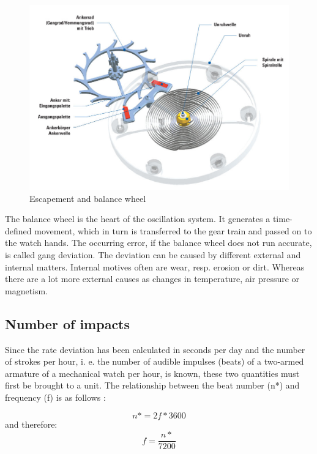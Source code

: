 \documentclass[12pt, a4paper]{report}
\begin{document}
    \noindent
    \begin{figure}[H]
    \centering
    \includegraphics[scale=0.4]{Images/Hemmung-Teil1.jpg}
    
    \caption{Escapement and balance wheel \cite{Uhrwerk}}
    \end{figure}
\bigskip
The balance wheel is the heart of the oscillation system. It generates a time-defined movement, which in turn is transferred to the gear train and passed on to the watch hands. 
The occurring error, if the balance wheel does not run accurate, is called gang deviation. The deviation can be caused by different external and internal matters. Internal motives often are wear, resp. erosion or dirt. Whereas there are a lot more external causes as changes in temperature, air pressure or magnetism.
    
    \subsection{Number of impacts}
    Since the rate deviation has been calculated in seconds per day and the number of strokes per hour, i. e. the number of audible impulses (beats) of a two-armed armature of a mechanical watch per hour, is known, these two quantities must first be brought to a unit. The relationship between the beat number (n*) and frequency (f) is as follows \cite{Krug1987}: 
    
    \begin{displaymath}
    n* = 2f*3600
     \end{displaymath}
     and therefore:
     \begin{displaymath}
      f = \frac{n*}{7200}
     \end{displaymath}
     
\end{document}
